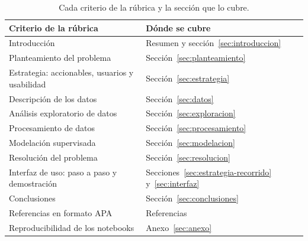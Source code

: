 \begin{table}[htbp]
  \centering\small
  \begin{tabularx}{\textwidth}{>{\raggedright\arraybackslash}p{6.6cm} >{\raggedright\arraybackslash}X}
    \toprule
    Criterio de la rúbrica & Dónde se cubre \\
    \midrule
    Introducción & Resumen y sección~\ref{sec:introduccion} \\
    Planteamiento del problema & Sección~\ref{sec:planteamiento} \\
    Estrategia: accionables, usuarios y usabilidad & Sección~\ref{sec:estrategia} \\
    Descripción de los datos & Sección~\ref{sec:datos} \\
    Análisis exploratorio de datos & Sección~\ref{sec:exploracion} \\
    Procesamiento de datos & Sección~\ref{sec:procesamiento} \\
    Modelación supervisada & Sección~\ref{sec:modelacion} \\
    Resolución del problema & Sección~\ref{sec:resolucion} \\
    Interfaz de uso: paso a paso y demostración & Secciones~\ref{sec:estrategia-recorrido}
    y~\ref{sec:interfaz} \\
    Conclusiones & Sección~\ref{sec:conclusiones} \\
    Referencias en formato APA & Referencias \\
    Reproducibilidad de los notebooks & Anexo~\ref{sec:anexo} \\
    \bottomrule
  \end{tabularx}
  \caption{Cada criterio de la rúbrica y la sección que lo cubre.}
  \label{tab:rubrica}
\end{table}
